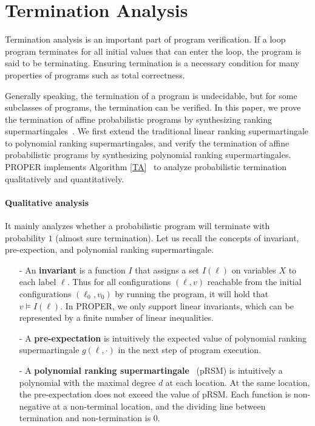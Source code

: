 \documentclass[runningheads]{llncs}
\begin{document}
\section{Termination Analysis}
Termination analysis is an important part of program verification. If a loop program terminates for all initial values that can enter the loop, the program is said to be terminating. Ensuring termination is a necessary condition for many properties of programs such as total correctness. 

Generally speaking, the termination of a program is undecidable, but for some subclasses of programs, the termination can be verified. In this paper, we prove the termination of affine probabilistic programs by synthesizing ranking supermartingales~\cite{Chakarov2013Martingales}. We first extend the traditional linear ranking supermartingale to polynomial ranking supermartingales, and verify the termination of affine probabilistic programs by synthesizing polynomial ranking supermartingales. PROPER implements Algorithm \ref{TA}~\cite{kris2016termination,cha2015algorithmic} to analyze probabilistic termination qualitatively and quantitatively.  

\paragraph{Qualitative analysis} It mainly analyzes whether a probabilistic program will terminate with probability $1$ (almost sure termination).
Let us recall the concepts of invariant, pre-expection, and polynomial ranking supermartingale.
\begin{enumerate}
	\item[-] An \textbf{invariant} is a function $I$ that assigns a set $I(\ell)$ on variables $X$ to each label $\ell$. Thus for all configurations $(\ell,v)$  reachable from the initial configurations $(\ell_0, v_0)$ by running the program, it will hold that $v \vDash I(\ell)$. In PROPER, we only support linear invariants, which can be represented by a finite number of linear inequalities.
	\item[-] A \textbf{pre-expectation} is intuitively the expected value of polynomial ranking  supermartingale $g(\ell,\cdot)$ in the next step of program execution.
	\item[-] A \textbf{polynomial ranking supermartingale}~\cite{Chakarov2013Martingales} (pRSM) is intuitively a polynomial with the maximal degree $d$ at each location. At the same location, the pre-expectation does not exceed the value of pRSM. Each function is non-negative at a non-terminal location, and the dividing line between termination and non-termination is 0.
\end{enumerate}
\end{document}
